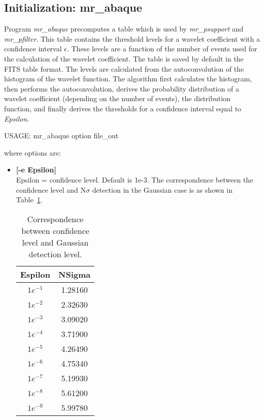 \begin{itemize}
\subsection{Initialization: mr\_abaque}
\label{sect_event}
Program 
{\em mr\_abaque} precomputes a table which is used by {\em mr\_psupport} and
{\em mr\_pfilter}. This table contains the threshold levels for a wavelet
coefficient with a confidence interval $\epsilon$. These levels are a 
function of the number of events used for
the calculation of the wavelet coefficient. The table is saved by default 
in the FITS table format. The levels are calculated from the autoconvolution of
the histogram of the wavelet function. The algorithm first calculates the
histogram, then performs the autoconvolution, derives the probability 
distribution
of a wavelet coefficient (depending on the number of events), the 
distribution function, and finally derives the thresholds for a confidence 
interval equal to {\em Epsilon}.
{\bf
\begin{center}
 USAGE: mr\_abaque option file\_out
\end{center}}
where options are: 
\begin{itemize}
\baselineskip=0.4truecm
\item {\bf [-e Epsilon]} \\
Epsilon = confidence level. Default is 1e-3. The correspondence between
the confidence level and N$\sigma$ detection in the Gaussian case is as 
shown in Table~\ref{corrtable}.

\begin{table}
\begin{center}
\begin{tabular}{cc}\hline \hline
 Espilon & NSigma \\ \hline
 $1e^{-1}$ & 1.28160 \\ 
 $1e^{-2}$ &  2.32630 \\ 
 $1e^{-3}$ &  3.09020 \\ 
 $1e^{-4}$ & 3.71900 \\ 
 $1e^{-5}$ & 4.26490 \\ 
 $1e^{-6}$ &  4.75340 \\ 
 $1e^{-7}$ & 5.19930 \\ 
 $1e^{-8}$ & 5.61200 \\ 
 $1e^{-9}$ & 5.99780 \\ \hline \hline
\end{tabular}
\end{center}
\caption{Correspondence between confidence level and Gaussian detection
level.}
\label{corrtable}
\end{table}


\end{itemize}
\end{itemize}

